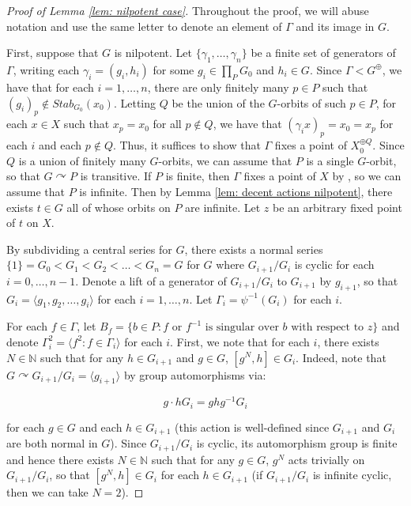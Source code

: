 \documentclass[12pt]{article}
\theoremstyle{definition}
\newcommand{\N}{\mathbb{N}}
\begin{document}
\begin{proof}[Proof of Lemma \ref{lem: nilpotent case}]

Throughout the proof, we will abuse notation and use the same letter to denote an element of $\Gamma$ and its image in $G$.

First, suppose that $G$ is nilpotent. Let $\{\gamma_1,\ldots,\gamma_n\}$ be a finite set of generators of $\Gamma$, writing each $\gamma_i = (g_i, h_i)$ for some $g_i \in \prod_P G_0$ and $h_i \in G$. Since $\Gamma < G^{\oplus}$, we have that for each $i = 1,\ldots,n$, there are only finitely many $p \in P$ such that $(g_i)_p \notin Stab_{G_0}(x_0)$. Letting $Q$ be the union of the $G$-orbits of such $p \in P$, for each $x \in X$ such that $x_p = x_0$ for all $p \notin Q$, we have that $(\gamma_i x)_p = x_0 = x_p$ for each $i$ and each $p \notin Q$. Thus, it suffices to show that $\Gamma$ fixes a point of $X_0^{\oplus Q}$. Since $Q$ is a union of finitely many $G$-orbits, we can assume that $P$ is a single $G$-orbit, so that $G \curvearrowright P$ is transitive. If $P$ is finite, then $\Gamma$ fixes a point of $X$ by \cite[Remark 4.2]{Algebraic}, so we can assume that $P$ is infinite. Then by Lemma \ref{lem: decent actions nilpotent}, there exists $t \in G$ all of whose orbits on $P$ are infinite. Let $z$ be an arbitrary fixed point of $t$ on $X$. 


By subdividing a central series for $G$, there exists a normal series $\{1\} = G_0 < G_1 < G_2 < \ldots < G_n = G$ for $G$ where $G_{i+1} / G_i$ is cyclic for each $i = 0, \ldots, n-1$. Denote a lift of a generator of $G_{i+1} / G_i$ to $G_{i+1}$ by $g_{i+1}$, so that $G_i = \langle g_1, g_2, \ldots, g_i \rangle$ for each $i = 1,\ldots, n$. Let $\Gamma_i = \psi^{-1}(G_i)$ for each $i$. 

    For each $f \in \Gamma$, let $B_f = \{b \in P: f \text{ or $f^{-1}$ is singular over } b \text{ with respect to }z\}$ and denote $\Gamma_i^2 = \langle f^2 : f \in \Gamma_i \rangle$ for each $i$.  First, we note that for each $i$, there exists $N \in \N$ such that for any $h \in G_{i+1}$ and $g \in G$, $[g^N, h] \in G_i$. Indeed, note that $G \curvearrowright G_{i+1}/G_i = \langle g_{i+1} \rangle$ by group automorphisms via:
    
    $$g \cdot h G_i = ghg^{-1} G_i$$

    for each $g \in G$ and each $h \in G_{i+1}$ (this action is well-defined since $G_{i+1}$ and $G_i$ are both normal in $G$). Since $G_{i+1}/G_i$ is cyclic, its automorphism group is finite and hence there exists $N \in \N$ such that for any $g \in G$, $g^N$ acts trivially on $G_{i+1}/G_i$, so that $[g^N, h] \in G_i$ for each $h \in G_{i+1}$ (if $G_{i+1}/G_i$ is infinite cyclic, then we can take $N = 2$). 
    

\end{proof}
\end{document}
